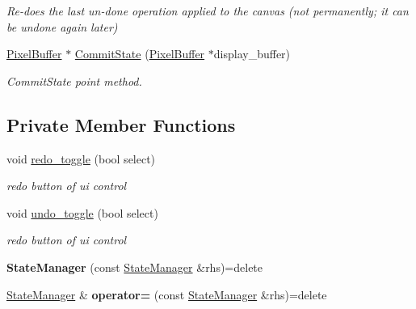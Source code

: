 \begin{DoxyCompactItemize}
\begin{DoxyCompactList}\small\item\em Re-\/does the last un-\/done operation applied to the canvas (not permanently; it can be undone again later) \end{DoxyCompactList}\item 
\hyperlink{classimage__tools_1_1PixelBuffer}{Pixel\+Buffer} $\ast$ \hyperlink{classimage__tools_1_1StateManager_a739110673567bdae3826d597192443eb}{Commit\+State} (\hyperlink{classimage__tools_1_1PixelBuffer}{Pixel\+Buffer} $\ast$display\+\_\+buffer)\hypertarget{classimage__tools_1_1StateManager_a739110673567bdae3826d597192443eb}{}\label{classimage__tools_1_1StateManager_a739110673567bdae3826d597192443eb}

\begin{DoxyCompactList}\small\item\em Commit\+State point method. \end{DoxyCompactList}\end{DoxyCompactItemize}
\subsection*{Private Member Functions}
\begin{DoxyCompactItemize}
\item 
void \hyperlink{classimage__tools_1_1StateManager_af5b298291a12460eb3ab6c7af9c16e70}{redo\+\_\+toggle} (bool select)\hypertarget{classimage__tools_1_1StateManager_af5b298291a12460eb3ab6c7af9c16e70}{}\label{classimage__tools_1_1StateManager_af5b298291a12460eb3ab6c7af9c16e70}

\begin{DoxyCompactList}\small\item\em redo button of ui control \end{DoxyCompactList}\item 
void \hyperlink{classimage__tools_1_1StateManager_ab617fd412a4fa0d757cd96f5bf836dd0}{undo\+\_\+toggle} (bool select)\hypertarget{classimage__tools_1_1StateManager_ab617fd412a4fa0d757cd96f5bf836dd0}{}\label{classimage__tools_1_1StateManager_ab617fd412a4fa0d757cd96f5bf836dd0}

\begin{DoxyCompactList}\small\item\em redo button of ui control \end{DoxyCompactList}\item 
{\bfseries State\+Manager} (const \hyperlink{classimage__tools_1_1StateManager}{State\+Manager} \&rhs)=delete\hypertarget{classimage__tools_1_1StateManager_ab3202a4aaa1fbf6415597218f6182530}{}\label{classimage__tools_1_1StateManager_ab3202a4aaa1fbf6415597218f6182530}

\item 
\hyperlink{classimage__tools_1_1StateManager}{State\+Manager} \& {\bfseries operator=} (const \hyperlink{classimage__tools_1_1StateManager}{State\+Manager} \&rhs)=delete\hypertarget{classimage__tools_1_1StateManager_a84c8b7a722a9e41da3569ad1d3a05f21}{}\label{classimage__tools_1_1StateManager_a84c8b7a722a9e41da3569ad1d3a05f21}

\end{DoxyCompactItemize}
